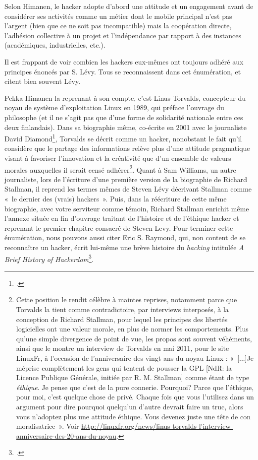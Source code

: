\documentclass{FramateX}
\begin{document}
\begin{refsection}
Selon Himanen, le hacker adopte d'abord une attitude et
un engagement avant de considérer ses activités comme un métier dont le
mobile principal n'est pas l'argent
(bien que ce ne soit pas incompatible) mais la coopération directe,
l'adhésion collective à un projet et
l'indépendance par rapport à des instances
(académiques, industrielles, etc.).

Il est frappant de voir combien les hackers eux-mêmes ont toujours
adhéré aux principes énoncés par S. Lévy. Tous se reconnaissent dans
cet énumération, et citent bien souvent Lévy.

Pekka Himanen la reprenant à son compte, c'est Linus
Torvalds, concepteur du noyau de système
d'exploitation Linux en 1989, qui préface
l'ouvrage du philosophe (et il ne
s'agit pas que d'une forme de
solidarité nationale entre ces deux finlandais). Dans sa biographie
même, co-écrite en 2001 avec le journaliste David Diamond\footnote{\cite{torvaldil2001}.}, Torvalds se décrit comme un hacker, nonobstant le fait
qu'il considère que le partage des informations relève
plus d'une attitude pragmatique visant à favoriser
l'innovation et la créativité que
d'un ensemble de valeurs morales auxquelles il serait
censé adhérer\footnote{Cette position le rendit célèbre à maintes
reprises, notamment parce que Torvalds la tient comme contradictoire,
par interviews interposés, à la conception de Richard Stallman, pour
lequel les principes des libertés logicielles ont une valeur morale, en
plus de normer les comportements. Plus qu'une simple
divergence de point de vue, les propos sont souvent véhéments, ainsi
que le montre un interview de Torvalds en mai 2011, pour le site
LinuxFr, à l'occasion de
l'anniversaire des vingt ans du noyau Linux :
«~[...]Je méprise complètement les gens qui tentent de pousser la GPL
[NdR: la Licence Publique Générale, initiée par R. M. Stallman] comme
étant de type \textit{éthique}. Je pense que c'est de
la pure connerie. Pourquoi? Parce que l'éthique, pour
moi, c'est quelque chose de privé. Chaque fois que
vous l'utilisez dans un argument pour dire pourquoi
quelqu'un d'autre devrait faire un
truc, alors vous n'adoptez plus une attitude éthique.
Vous devenez juste une tête de con moralisatrice~». Voir
\url{http://linuxfr.org/news/linus-torvalds-l'interview-anniversaire-des-20-ans-du-noyau}.}.
Quant à Sam Williams, un autre journaliste, lors de
l'écriture d'une première version de
la biographie de Richard Stallman, il reprend les termes mêmes de
Steven Lévy décrivant Stallman comme «~le dernier des (vrais)
hackers~». Puis, dans la réécriture de cette même biographie, avec
votre serviteur comme témoin, Richard Stallman enrichit même
l'annexe située en fin d'ouvrage
traitant de l'histoire et de
l'éthique hacker et reprenant le premier chapitre
consacré de Steven Levy. Pour terminer cette énumération, nous pouvons
aussi citer Eric S. Raymond, qui, non content de se reconnaître un
hacker, écrit lui-même une brève histoire du \textit{hacking} intitulée
\textit{A Brief History of Hackerdom}\footnote{\cite{raymondbrief1999}.}.


\end{refsection}
\end{document}
